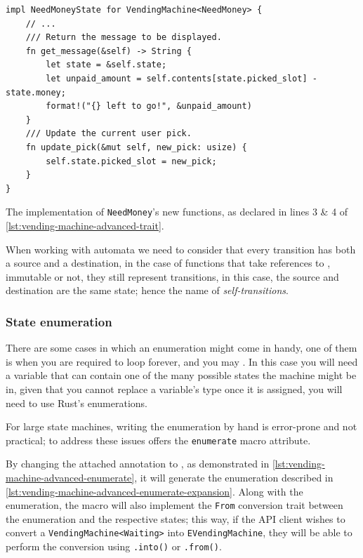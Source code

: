 \begin{listing}
    \begin{verbatim}
impl NeedMoneyState for VendingMachine<NeedMoney> {
    // ...
    /// Return the message to be displayed.
    fn get_message(&self) -> String {
        let state = &self.state;
        let unpaid_amount = self.contents[state.picked_slot] - state.money;
        format!("{} left to go!", &unpaid_amount)
    }
    /// Update the current user pick.
    fn update_pick(&mut self, new_pick: usize) {
        self.state.picked_slot = new_pick;
    }
}
    \end{verbatim}
    \caption{The implementation of \texttt{NeedMoney}'s new functions, as declared in lines 3 \& 4 of \autoref{lst:vending-machine-advanced-trait}.}
    \label{lst:vending-machine-advanced-trait-impl}
\end{listing}

When working with automata we need to consider that every transition has both a source and a destination,
in the case of functions that take references to , immutable or not,
they still represent transitions, in this case, the source and destination are the same state;
hence the name of \emph{self-transitions}.

\subsubsection{State enumeration}

There are some cases in which an enumeration might come in handy,
one of them is when you are required to loop forever,
and you may  .
In this case you will need a variable that can contain one of the many possible states the machine might be in,
given that you cannot replace a variable's type once it is assigned, you will need to use Rust's enumerations.

For large state machines, writing the enumeration by hand is error-prone and not practical;
to address these issues  offers the \texttt{enumerate} macro attribute.

By changing the attached  annotation to ,
as demonstrated in \autoref{lst:vending-machine-advanced-enumerate},
it will generate the enumeration described in \autoref{lst:vending-machine-advanced-enumerate-expansion}.
Along with the enumeration, the macro will also implement the \texttt{From} conversion trait between the enumeration and the respective states;
this way, if the API client wishes to convert a \texttt{VendingMachine<Waiting>} into \texttt{EVendingMachine},
they will be able to perform the conversion using \texttt{.into()} or \texttt{.from()}.

